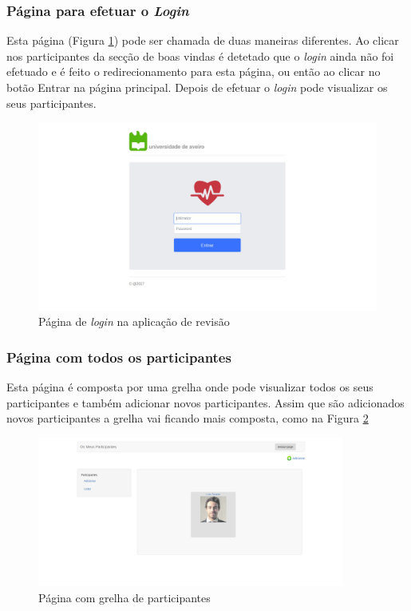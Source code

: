 \subsubsection{Página para efetuar o \textit{Login}}
Esta página (Figura \ref{f:web-login}) pode ser chamada de duas maneiras diferentes. Ao clicar nos participantes da secção de boas vindas é detetado que o \textit{login} ainda não foi efetuado e é feito o redirecionamento para esta página, ou então ao clicar no botão Entrar na página principal. Depois de efetuar o \textit{login} pode visualizar os seus participantes.

\begin{figure}[H]
\centering
\includegraphics[width=1\textwidth]{imgs/login_web.png}
\caption[Página de \textit{login} na aplicação de revisão]{Página de \textit{login} na aplicação de revisão}
\label{f:web-login}
\end{figure}

\subsubsection{Página com todos os participantes}
Esta página é composta por uma grelha onde pode visualizar todos os seus participantes e também adicionar novos participantes. Assim que são adicionados novos participantes a grelha vai ficando mais composta, como na Figura \ref{f:gridParticipante}

\begin{figure}[H]
\centering
\includegraphics[width=0.9\textwidth]{imgs/list_after_add_web.png}
\caption[Página com grelha de participantes]{Página com grelha de participantes}
\label{f:gridParticipante}
\end{figure}



